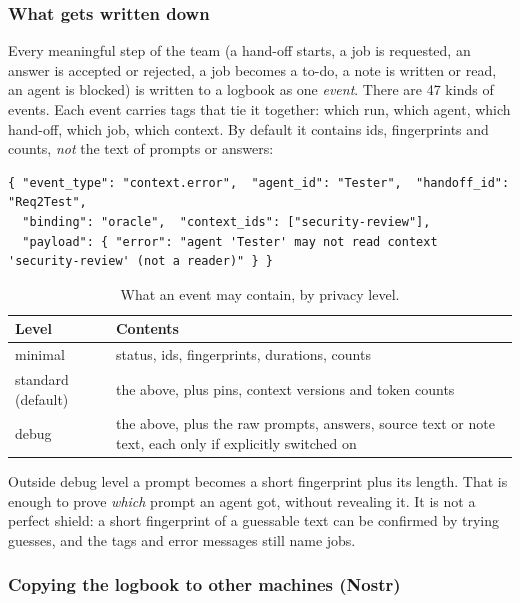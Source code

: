 \documentclass[10pt,a4paper]{article}
\begin{document}
\subsubsection*{What gets written down}

Every meaningful step of the team (a hand-off starts, a job is requested, an answer is accepted or rejected, a
job becomes a to-do, a note is written or read, an agent is blocked) is written to a logbook as one \emph{event}.
There are 47 kinds of events. Each event carries tags that tie it together: which run, which agent, which
hand-off, which job, which context. By default it contains ids, fingerprints and counts, \emph{not} the text of
prompts or answers:

\begin{lstlisting}[style=engine, caption={A real event: the Tester was refused a note it was not allowed to read.}, label={lst:event}]
{ "event_type": "context.error",  "agent_id": "Tester",  "handoff_id": "Req2Test",
  "binding": "oracle",  "context_ids": ["security-review"],
  "payload": { "error": "agent 'Tester' may not read context 'security-review' (not a reader)" } }
\end{lstlisting}

\begin{table}[h]
\centering\small
\caption{What an event may contain, by privacy level.}
\label{tab:privacy}
\begin{tabularx}{\textwidth}{@{}l X@{}}
\toprule
Level & Contents \\
\midrule
minimal & status, ids, fingerprints, durations, counts \\
standard (default) & the above, plus pins, context versions and token counts \\
debug & the above, plus the raw prompts, answers, source text or note text, each only if explicitly switched on \\
\bottomrule
\end{tabularx}
\end{table}

Outside debug level a prompt becomes a short fingerprint plus its length. That is enough to prove \emph{which}
prompt an agent got, without revealing it. It is not a perfect shield: a short fingerprint of a guessable text can
be confirmed by trying guesses, and the tags and error messages still name jobs.

\subsubsection*{Copying the logbook to other machines (Nostr)}
\end{document}
